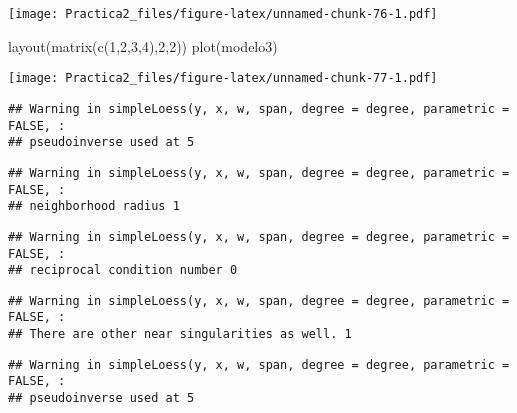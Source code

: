 \documentclass[
]{article}
\newenvironment{Shaded}{\begin{snugshade}}{\end{snugshade}}
\newcommand{\CommentTok}[1]{\textcolor[rgb]{0.56,0.35,0.01}{\textit{#1}}}
\newcommand{\DecValTok}[1]{\textcolor[rgb]{0.00,0.00,0.81}{#1}}
\newcommand{\FunctionTok}[1]{\textcolor[rgb]{0.00,0.00,0.00}{#1}}
\newcommand{\NormalTok}[1]{#1}
\newcommand{\SpecialCharTok}[1]{\textcolor[rgb]{0.00,0.00,0.00}{#1}}
\begin{document}
\texttt{[image: Practica2\_files/figure-latex/unnamed-chunk-76-1.pdf]}

\begin{Shaded}
\begin{Highlighting}[]
\FunctionTok{layout}\NormalTok{(}\FunctionTok{matrix}\NormalTok{(}\FunctionTok{c}\NormalTok{(}\DecValTok{1}\NormalTok{,}\DecValTok{2}\NormalTok{,}\DecValTok{3}\NormalTok{,}\DecValTok{4}\NormalTok{),}\DecValTok{2}\NormalTok{,}\DecValTok{2}\NormalTok{))}
\FunctionTok{plot}\NormalTok{(modelo3)}
\end{Highlighting}
\end{Shaded}

\texttt{[image: Practica2\_files/figure-latex/unnamed-chunk-77-1.pdf]}

\begin{Shaded}
\end{Shaded}

\begin{verbatim}
## Warning in simpleLoess(y, x, w, span, degree = degree, parametric = FALSE, :
## pseudoinverse used at 5
\end{verbatim}

\begin{verbatim}
## Warning in simpleLoess(y, x, w, span, degree = degree, parametric = FALSE, :
## neighborhood radius 1
\end{verbatim}

\begin{verbatim}
## Warning in simpleLoess(y, x, w, span, degree = degree, parametric = FALSE, :
## reciprocal condition number 0
\end{verbatim}

\begin{verbatim}
## Warning in simpleLoess(y, x, w, span, degree = degree, parametric = FALSE, :
## There are other near singularities as well. 1
\end{verbatim}

\begin{verbatim}
## Warning in simpleLoess(y, x, w, span, degree = degree, parametric = FALSE, :
## pseudoinverse used at 5
\end{verbatim}
\end{document}

